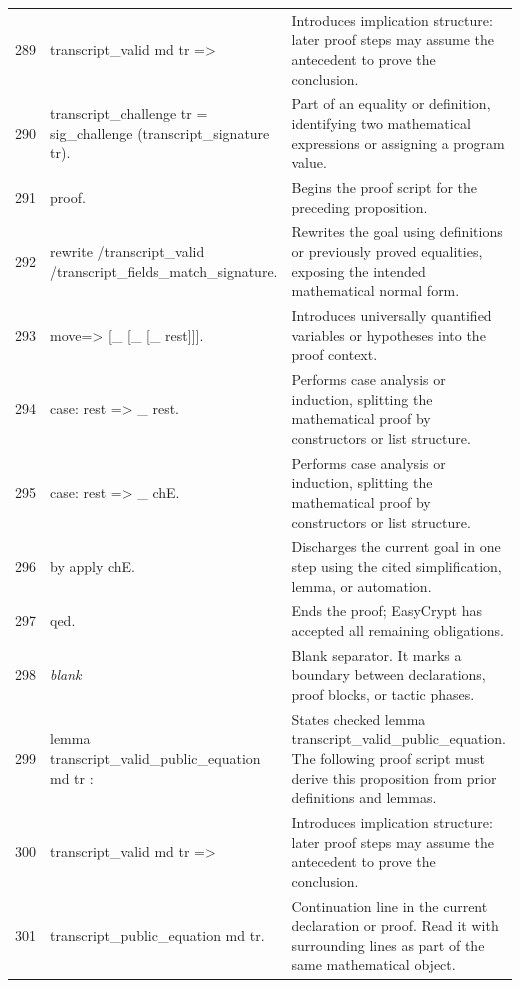\documentclass[10pt]{article}
\begin{document}
\begin{longtable}{r L{0.53\textwidth} L{0.37\textwidth}}
289 & {\ttfamily\scriptsize   transcript\_valid md tr =>} & Introduces implication structure: later proof steps may assume the antecedent to prove the conclusion. \\
290 & {\ttfamily\scriptsize   transcript\_challenge tr = sig\_challenge (transcript\_signature tr).} & Part of an equality or definition, identifying two mathematical expressions or assigning a program value. \\
291 & {\ttfamily\scriptsize proof.} & Begins the proof script for the preceding proposition. \\
292 & {\ttfamily\scriptsize rewrite /transcript\_valid /transcript\_fields\_match\_signature.} & Rewrites the goal using definitions or previously proved equalities, exposing the intended mathematical normal form. \\
293 & {\ttfamily\scriptsize move=> [\_ [\_ [\_ rest]]].} & Introduces universally quantified variables or hypotheses into the proof context. \\
294 & {\ttfamily\scriptsize case: rest => \_ rest.} & Performs case analysis or induction, splitting the mathematical proof by constructors or list structure. \\
295 & {\ttfamily\scriptsize case: rest => \_ chE.} & Performs case analysis or induction, splitting the mathematical proof by constructors or list structure. \\
296 & {\ttfamily\scriptsize by apply chE.} & Discharges the current goal in one step using the cited simplification, lemma, or automation. \\
297 & {\ttfamily\scriptsize qed.} & Ends the proof; EasyCrypt has accepted all remaining obligations. \\
298 & {\ttfamily\scriptsize \emph{blank}} & Blank separator.  It marks a boundary between declarations, proof blocks, or tactic phases. \\
299 & {\ttfamily\scriptsize lemma transcript\_valid\_public\_equation md tr :} & States checked lemma transcript\_valid\_public\_equation.  The following proof script must derive this proposition from prior definitions and lemmas. \\
300 & {\ttfamily\scriptsize   transcript\_valid md tr =>} & Introduces implication structure: later proof steps may assume the antecedent to prove the conclusion. \\
301 & {\ttfamily\scriptsize   transcript\_public\_equation md tr.} & Continuation line in the current declaration or proof.  Read it with surrounding lines as part of the same mathematical object. \\

\end{longtable}
\end{document}
